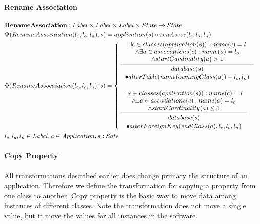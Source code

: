\documentclass[11pt]{article}
\begin{document}
\paragraph{Rename Association}
\begin{align*}
& \mathbf{RenameAssociation} : Label \times Label \times Label \times State \rightarrow State \\
& \Psi(RenameAssocaiation(l_c, l_o, l_n), s) = application(s) \circ renAssoc(l_c, l_o, l_n)\\
& \Phi(RenameAssocaiation(l_c, l_o, l_n), s) = \begin{cases}
	\inference{\exists c \in classes(application(s)) : name(c) = l\\ 
		\wedge \exists a \in associations(c) : name(a) = l_o 
	\\ \wedge startCardinality(a) > 1 }{\begin{gathered}
		database(s) \\ \bullet alterTable(name(owningClass(a)) + l_o, l_n)
\end{gathered}}\\ \\
  \inference{\exists c \in classes(application(s)) : name(c) = l\\ 
		\wedge \exists a \in associations(c) : name(a) = l_o 
	\\ \wedge startCardinality(a) \leq 1 }{\begin{gathered}
database(s) \\ \bullet alterForeignKey(endClass(a) ,l_c, l_o, l_n)
\end{gathered}}
 \end{cases} \\
&	l_c, l_o, l_n \in Label, a \in Application, s : Sate
\end{align*}


\paragraph{Copy Property}
All transformations described earlier does change primary the structure of an application. Therefore we define  the transformation for copying a property from one class to another. Copy property is the basic way to move data among instances of different classes. Note the transformation does not move a single value, but it move the values for all instances in the software.
\end{document}
